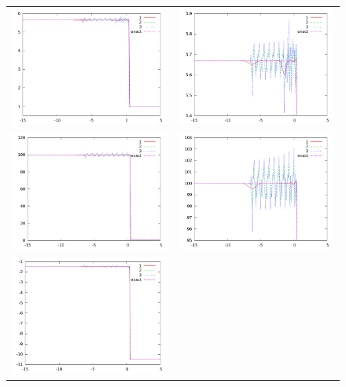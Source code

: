 \documentclass[letterpaper,12pt]{article}
\begin{document}
\begin{figure}[h]
  \begin{center}
	\begin{tabular}{cc}
      \includegraphics[width=.4\textwidth]{den_T11.png} &
	  \includegraphics[width=.4\textwidth]{den11zoom.png} \\
	  \includegraphics[width=.4\textwidth]{prs_T11.png} &	
	  \includegraphics[width=.4\textwidth]{prs11zoom.png} \\
      \includegraphics[width=.4\textwidth]{vel_T11.png} &	

\end{tabular}
\end{center}
\end{figure}
\end{document}
